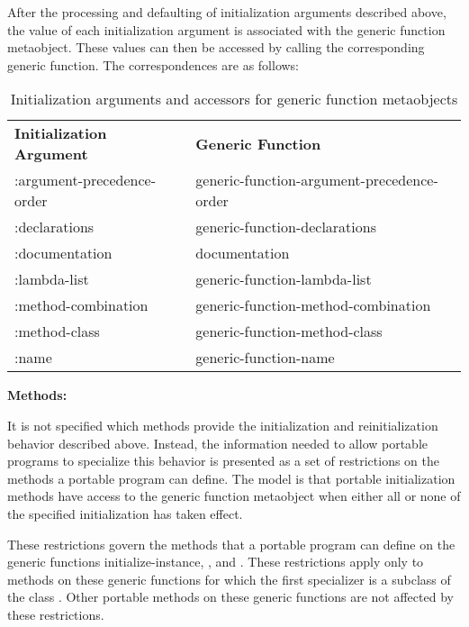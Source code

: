 After the processing and defaulting of initialization arguments described above,
the value of each initialization argument is associated with the generic
function metaobject. These values can then be accessed by calling the
corresponding generic function. The correspondences are as follows:

\begin{table}[t]
\caption{Initialization arguments and accessors for generic function
  metaobjects}
\label{INITARGS-ACCESSORS-FOR-GENERIC-FUNCTION}
\begin{flushleft}
\cf
\begin{tabular}{@{}ll@{}}
\textbf{Initialization Argument}&\textbf{Generic Function}\\
:argument-precedence-order&generic-function-argument-precedence-order\\
:declarations&generic-function-declarations\\
:documentation&documentation\\
:lambda-list&generic-function-lambda-list\\
:method-combination&generic-function-method-combination\\
:method-class&generic-function-method-class\\
:name&generic-function-name
\end{tabular}
\end{flushleft}
\end{table}

\textbf{Methods:}

It is not specified which methods provide the initialization and
reinitialization behavior described above. Instead, the information needed to
allow portable programs to specialize this behavior is presented as a set of
restrictions on the methods a portable program can define. The model is that
portable initialization methods have access to the generic function metaobject
when either all or none of the specified initialization has taken effect.

These restrictions govern the methods that a portable program can define on the
generic functions initialize-instance, , and
. These restrictions apply only to methods on these generic
functions for which the first specializer is a subclass of the class
. Other portable methods on these generic functions are not
affected by these restrictions.

